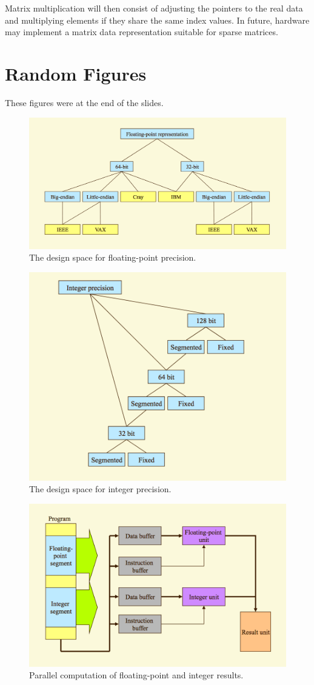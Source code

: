 Matrix multiplication will then consist of adjusting the pointers to the real data and multiplying elements if they share the same index values. In future, hardware may implement a matrix data representation suitable for sparse matrices.

\section{Random Figures}
These figures were at the end of the slides.

\begin{figure}
\centering
\includegraphics[width=0.5\linewidth]{screenshot087}
\caption{The design space for floating-point precision.}
\label{fig:screenshot087}
\end{figure}

\begin{figure}
\centering
\includegraphics[width=0.5\linewidth]{screenshot088}
\caption{The design space for integer precision.}
\label{fig:screenshot088}
\end{figure}

\begin{figure}
\centering
\includegraphics[width=0.5\linewidth]{screenshot089}
\caption{Parallel computation of floating-point and integer results.}
\label{fig:screenshot089}
\end{figure}

